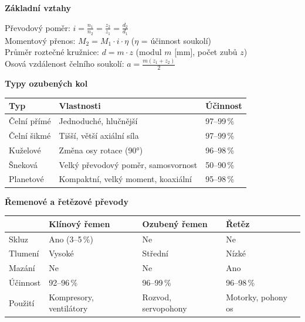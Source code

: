 \documentclass[a4paper,10pt]{article}
\begin{document}
\begin{vysvetlenibox}
\textbf{Základní vztahy}

\begin{vzorcebox}
Převodový poměr: $i = \frac{n_1}{n_2} = \frac{z_2}{z_1} = \frac{d_2}{d_1}$\\
Momentový přenos: $M_2 = M_1 \cdot i \cdot \eta$
\quad ($\eta$ = účinnost soukolí)\\
Průměr roztečné kružnice: $d = m \cdot z$
\quad (modul $m$ [mm], počet zubů $z$)\\
Osová vzdálenost čelního soukolí:
$a = \frac{m(z_1 + z_2)}{2}$
\end{vzorcebox}

\textbf{Typy ozubených kol}

\begin{center}
\begin{tabularx}{0.95\linewidth}{@{} l X l @{}}
    \toprule
    \textbf{Typ} & \textbf{Vlastnosti} & \textbf{Účinnost} \\
    \midrule
    Čelní přímé    & Jednoduché, hlučnější & 97--99\,\% \\
    Čelní šikmé    & Tišší, větší axiální síla & 97--99\,\% \\
    Kuželové       & Změna osy rotace (90°) & 96--98\,\% \\
    Šneková        & Velký převodový poměr, samosvornost & 50--90\,\% \\
    Planetové      & Kompaktní, velký moment, koaxiální & 95--98\,\% \\
    \bottomrule
\end{tabularx}
\end{center}

\textbf{Řemenové a řetězové převody}

\begin{center}
\begin{tabularx}{0.95\linewidth}{@{} l X X X @{}}
    \toprule
    & \textbf{Klínový řemen} & \textbf{Ozubený řemen}
    & \textbf{Řetěz} \\
    \midrule
    Skluz      & Ano (3--5\,\%) & Ne & Ne \\
    Tlumení    & Vysoké & Střední & Nízké \\
    Mazání     & Ne & Ne & Ano \\
    Účinnost   & 92--96\,\% & 96--99\,\% & 96--98\,\% \\
    Použití    & Kompresory, ventilátory & Rozvod, servopohony
               & Motorky, pohony os \\
    \bottomrule
\end{tabularx}
\end{center}
\end{vysvetlenibox}
\end{document}
